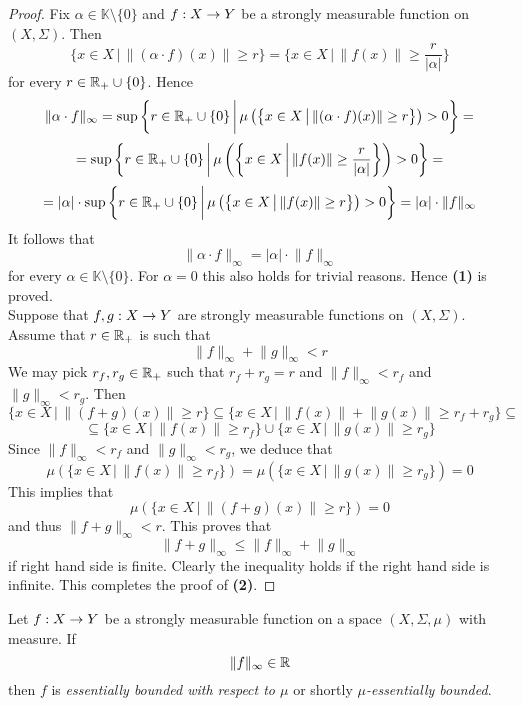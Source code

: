 \begin{proof}
    Fix $\alpha \in \mathbb{K}\setminus \{0\}$ and $f:X\rightarrow Y$ be a strongly measurable function on $(X,\Sigma)$. Then
    $$\{x\in X\,\big|\,\lVert (\alpha \cdot f)(x)\rVert \geq r\big\} = \bigg\{x\in X\,\bigg|\,\lVert f(x)\rVert \geq \frac{r}{|\alpha|}\bigg\}$$
    for every $r \in {\mathbb R}_+\cup \{0\}$. Hence
    $$\lVert \alpha \cdot f\rVert_{\infty} = \sup \bigg\{r\in {\mathbb R}_+\cup \{0\}\,\bigg|\,\mu\left(\big\{x\in X\,\big|\,\lVert (\alpha \cdot f)(x)\rVert \geq r\big\}\right) > 0\bigg\} =$$
    $$= \sup \bigg\{r \in {\mathbb R}_+\cup \{0\}\,\bigg|\,\mu\left(\bigg\{x\in X\,\bigg|\,\lVert f(x)\rVert \geq \frac{r}{|\alpha|}\bigg\}\right) > 0\bigg\} = $$
    $$= |\alpha| \cdot \sup \bigg\{r \in {\mathbb R}_+\cup \{0\}\,\bigg|\,\mu\left(\big\{x\in X\,\big|\,\lVert f(x)\rVert \geq r\big\}\right) > 0\bigg\} = |\alpha|\cdot \lVert f\rVert_{\infty}$$
    It follows that
    $$\lVert \alpha \cdot f\rVert_{\infty} = |\alpha|\cdot \lVert f\rVert_{\infty}$$
    for every $\alpha \in \mathbb{K}\setminus \{0\}$. For $\alpha = 0$ this also holds for trivial reasons. Hence \textbf{(1)} is proved.\\
    Suppose that $f,g:X\rightarrow Y$ are strongly measurable functions on $(X,\Sigma)$. Assume that $r\in {\mathbb R}_+$ is such that
    $$\lVert f \rVert_{\infty} + \lVert g \rVert_{\infty} < r$$
    We may pick $r_f,r_g\in {\mathbb R}_+$ such that $r_f+r_g = r$ and $\lVert f \rVert_{\infty} < r_f$ and $\lVert g \rVert_{\infty} < r_g$. Then
    $$\{x\in X\,\big|\,\lVert (f + g)(x)\rVert \geq r\big\} \subseteq \big\{x\in X\,\big|\,\lVert f(x)\rVert + \lVert g(x)\rVert \geq r_f + r_g\big\} \subseteq $$
    $$\subseteq \big\{x\in X\,\big|\,\lVert f(x)\rVert  \geq r_f\big\} \cup \big\{x\in X\,\big|\,\lVert g(x)\rVert  \geq r_g\big\}$$
    Since $\lVert f \rVert_{\infty} < r_f$ and $\lVert g \rVert_{\infty} < r_g$, we deduce that
    $$\mu\left(\big\{x\in X\,\big|\,\lVert f(x)\rVert  \geq r_f\big\}\right) = \mu\left(\big\{x\in X\,\big|\,\lVert g(x)\rVert  \geq r_g\big\}\right) = 0$$
    This implies that
    $$\mu\left(\{x\in X\,\big|\,\lVert (f + g)(x)\rVert \geq r\big\}\right) = 0$$
    and thus $\lVert f + g\rVert_{\infty} < r$. This proves that
    $$\lVert f + g \rVert_{\infty} \leq \lVert f \rVert_{\infty} + \lVert g \rVert_{\infty}$$
    if right hand side is finite. Clearly the inequality holds if the right hand side is infinite. This completes the proof of \textbf{(2)}.
\end{proof}

\begin{definition}
    Let $f:X\rightarrow Y$ be a strongly measurable function on a space $(X,\Sigma,\mu)$ with measure. If
    $$\lVert f \rVert_{\infty} \in {\mathbb R}$$
    then $f$ is \textit{essentially bounded with respect to $\mu$} or shortly \textit{$\mu$-essentially bounded}.
\end{definition}

